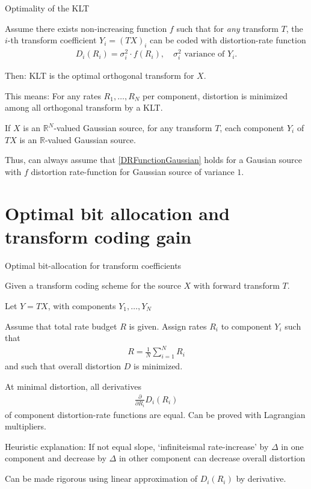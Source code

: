 \begin{frame}{Optimality of the KLT}
\bit
\item  Assume there exists non-increasing function $f$ such that for \textit{any} transform $T$, the $i$-th transform coefficient $Y_i=(TX)_i$ can be coded with distortion-rate function
\begin{align}\label{DRFunctionGaussian}
D_i(R_i)=\sigma_i^2\cdot f(R_i), \quad \text{$\sigma_i^2$ variance of $Y_i$}.
\end{align}
\item [\iarrow] Then: KLT is the optimal orthogonal transform for $X$.
\item This means: For any rates $R_1,\dots,R_N$ per component, distortion is minimized among all orthogonal transform by a KLT.
\eit
{} 
\bit
\item If $X$ is an $\mathbb{R}^N$-valued Gaussian source, for any transform $T$, each component $Y_i$ of $TX$ is an $\mathbb{R}$-valued Gaussian source.
\item Thus, can always assume that \eqref{DRFunctionGaussian} holds for a Gausian source with $f$ distortion rate-function for Gaussian source of variance $1$. 
\eit
\end{frame}

\section{Optimal bit allocation and transform coding gain}
\begin{frame}{Optimal bit-allocation for transform coefficients}
\bit
\item Given a transform coding scheme for the source $X$ with forward transform $T$.
\item Let $Y=TX$, with components $Y_1,\dots,Y_N$
\item {} Assume that total rate budget $R$ is given. Assign rates $R_i$ to component $Y_i$ such that 
\begin{align*}
R=\frac{1}{N}\sum_{i=1}^N R_i
\end{align*}
and such that overall distortion $D$ is minimized.
\item[\iarrow]  At minimal distortion, all derivatives
\begin{align*}
\frac{\partial}{\partial R_i}D_i(R_i) 
\end{align*}
of component distortion-rate functions are equal. Can be proved with Lagrangian multipliers.
\item Heuristic explanation: If not equal slope, `infiniteismal rate-increase' by $\Delta$ in one component and decrease by $\Delta$ in other component can decrease  overall distortion 
\item Can be made rigorous using linear approximation of $D_i(R_i)$ by derivative.  
\eit
\end{frame}

